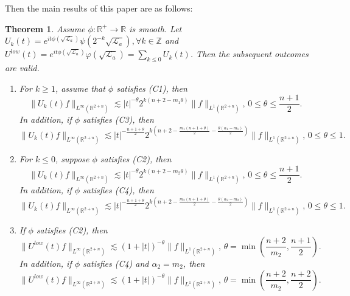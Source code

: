 \documentclass[a4paper,11pt, reqno]{amsart}
\numberwithin{equation}{section}
\theoremstyle{plain}
\newtheorem{theorem}{Theorem}[section]
\theoremstyle{definition}
\theoremstyle{remark}
\begin{document}
Then the main results of this paper are as follows:
\begin{theorem}\label{ResultTime}
	Assume $\phi:\mathbb{R}^+ \to \mathbb{R}$ is smooth. Let  $U_k(t)=e^{it\phi(\sqrt{\mathcal{L}_a})}\psi(2^{-k}\sqrt{\mathcal{L}_a}), \forall k\in\mathbb{Z}$ and $U^{low}(t)=e^{it\phi(\sqrt{\mathcal{L}_a})}\varphi(\sqrt{\mathcal{L}_a})=\sum\limits_{k\leq0} U_k(t)$.   Then the subsequent outcomes are valid.
 \begin{enumerate}
 \item[\textbf{(A)}]   For $k \geq 1$, assume that $\phi$ satisfies (C1), then
	\begin{equation*}\label{res3-2}
	\|U_k(t) f\|_{L^\infty(\mathbb{R}^{2+n})} \lesssim |t|^{-\theta}2^{k\left(n+2-m_1\theta\right)}\|f\|_{L^1(\mathbb{R}^{2+n})},\,0 \leq \theta \leq \frac{n+1}{2}.
	\end{equation*}
 In addition, if $\phi$ satisfies (C3), then
	\begin{equation*}\label{res3-3}
	\|U_k(t) f\|_{L^\infty(\mathbb{R}^{2+n})} \lesssim |t|^{-\frac{n+1+\theta}{2}}2^{k\left(n+2-\frac{m_1(n+1+\theta)}{2}-\frac{\theta(\alpha_1-m_1)}{2}\right)}\|f\|_{L^1(\mathbb{R}^{2+n})},\,   0 \leq \theta \leq 1.
	\end{equation*}
 \item[\textbf{(B)}] For $k\leq 0$, suppose $\phi$ satisfies (C2), then
	\begin{equation*}
	\|U_k(t) f\|_{L^\infty(\mathbb{R}^{2+n})} \lesssim |t|^{-\theta}2^{k\left(n+2-m_2\theta\right)}\|f\|_{L^1(\mathbb{R}^{2+n})},\,0 \leq \theta \leq \frac{n+1}{2}.
	\end{equation*}
In addition, if $\phi$ satisfies (C4), then
	\begin{equation*}
	\|U_k(t) f\|_{L^\infty(\mathbb{R}^{2+n})} \lesssim |t|^{-\frac{n+1+\theta}{2}}2^{k\left(n+2-\frac{m_2(n+1+\theta)}{2}-\frac{\theta(\alpha_2-m_2)}{2}\right)}\|f\|_{L^1(\mathbb{R}^{2+n})},\,   0 \leq \theta \leq 1.
	\end{equation*}
\item[\textbf{(C)}] If $\phi$ satisfies (C2), then
	\begin{equation}\label{res-sum1}
 \|U^{low}(t) f\|_{L^\infty(\mathbb{R}^{2+n})} \lesssim (1+|t|)^{-\theta}\|f\|_{L^1(\mathbb{R}^{2+n})},\,\theta=\min\left(\frac{n+2}{m_2},\frac{n+1}{2}\right).
	\end{equation}
In addition, if $\phi$ satisfies (C4) and $\alpha_2=m_2$, then
	\begin{equation}\label{res-sum2}
	\|U^{low}(t) f\|_{L^\infty(\mathbb{R}^{2+n})}  \lesssim (1+|t|)^{-\theta}\|f\|_{L^1(\mathbb{R}^{2+n})},\,\theta=\min\left(\frac{n+2}{m_2},\frac{n+2}{2}\right).
	\end{equation}
	 \end{enumerate}
\end{theorem}
\end{document}
